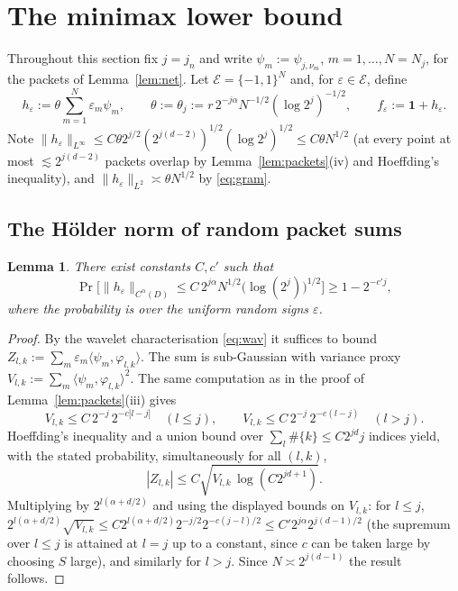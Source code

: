 \documentclass[11pt]{amsart}
\newtheorem{lemma}[theorem]{Lemma}
\newcommand{\1}{\mathbf{1}}
\begin{document}
\section{The minimax lower bound}\label{sec:lower}

Throughout this section fix $j=j_n$ and write $\psi_m:=\psi_{j,\nu_m}$,
$m=1,\dots,N=N_j$, for the packets of Lemma~\ref{lem:net}. Let
$\mathcal E=\{-1,1\}^N$ and, for $\varepsilon\in\mathcal E$, define
\begin{equation}\label{eq:adversary}
h_\varepsilon:=\theta\sum_{m=1}^N\varepsilon_m\psi_m,
\qquad
\theta:=\theta_j:=r\,2^{-j\alpha}N^{-1/2}(\log 2^j)^{-1/2},
\qquad f_\varepsilon:=\1+h_\varepsilon .
\end{equation}
Note $\|h_\varepsilon\|_{L^\infty}\le C\theta 2^{j/2}(2^{j(d-2)})^{1/2}
(\log 2^j)^{1/2}\le C\theta N^{1/2}$ (at every point at most
$\lesssim 2^{j(d-2)}$ packets overlap by Lemma~\ref{lem:packets}(iv) and
Hoeffding's inequality), and $\|h_\varepsilon\|_{L^2}\asymp\theta N^{1/2}$
by \eqref{eq:gram}.

\subsection{The H\"older norm of random packet sums}

\begin{lemma}\label{lem:Ca}
There exist constants $C,c'$ such that
\[
\Pr\Big[\|h_\varepsilon\|_{C^\alpha(D)}\le
C\,2^{j\alpha}N^{1/2}\big(\log(2^{j})\big)^{1/2}\Big]\ge 1-2^{-c'j},
\]
where the probability is over the uniform random signs $\varepsilon$.
\end{lemma}

\begin{proof}
By the wavelet characterisation \eqref{eq:wav} it suffices to bound
$Z_{l,k}:=\sum_m\varepsilon_m\langle\psi_m,\varphi_{l,k}\rangle$. The sum is
sub-Gaussian with variance proxy
$V_{l,k}:=\sum_m\langle\psi_m,\varphi_{l,k}\rangle^2$. The same computation as
in the proof of Lemma~\ref{lem:packets}(iii) gives
\[
V_{l,k}\le C\,2^{-j}\,2^{-c|l-j|}\quad(l\le j),\qquad
V_{l,k}\le C\,2^{-j}\,2^{-c(l-j)}\quad(l>j).
\]
Hoeffding's inequality and a union bound over
$\sum_l\#\{k\}\le C2^{jd}j$ indices yield, with the stated probability,
simultaneously for all $(l,k)$,
\[
|Z_{l,k}|\le C\sqrt{V_{l,k}\,\log(C2^{jd+1})}.
\]
Multiplying by $2^{l(\alpha+d/2)}$ and using the displayed bounds on
$V_{l,k}$: for $l\le j$,
$2^{l(\alpha+d/2)}\sqrt{V_{l,k}}\le
C2^{l(\alpha+d/2)}2^{-j/2}2^{-c(j-l)/2}\le C'2^{j\alpha}2^{j(d-1)/2}$
(the supremum over $l\le j$ is attained at $l=j$ up to a constant, since
$c$ can be taken large by choosing $S$ large), and similarly for $l>j$.
Since $N\asymp2^{j(d-1)}$ the result follows.
\end{proof}
\end{document}
